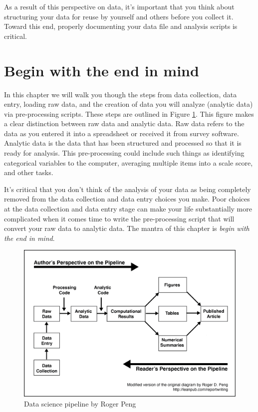 \documentclass[
]{krantz}
\begin{document}
As a result of this perspective on data, it's important that you think about structuring your data for reuse by yourself and others before you collect it. Toward this end, properly documenting your data file and analysis scripts is critical.

\hypertarget{begin-with-the-end-in-mind}{%
\section{Begin with the end in mind}\label{begin-with-the-end-in-mind}}

In this chapter we will walk you though the steps from data collection, data entry, loading raw data, and the creation of data you will analyze (analytic data) via pre-processing scripts. These steps are outlined in Figure \ref{fig:pipeline}. This figure makes a clear distinction between raw data and analytic data. Raw data refers to the data as you entered it into a spreadsheet or received it from survey software. Analytic data is the data that has been structured and processed so that it is ready for analysis. This pre-processing could include such things as identifying categorical variables to the computer, averaging multiple items into a scale score, and other tasks.

It's critical that you don't think of the analysis of your data as being completely removed from the data collection and data entry choices you make. Poor choices at the data collection and data entry stage can make your life substantially more complicated when it comes time to write the pre-processing script that will convert your raw data to analytic data. The mantra of this chapter is \emph{begin with the end in mind}.

\begin{figure}
\includegraphics[width=0.85\linewidth]{ch_enter_load/images/pipeline} \caption{Data science pipeline by Roger Peng}\label{fig:pipeline}
\end{figure}
\end{document}
